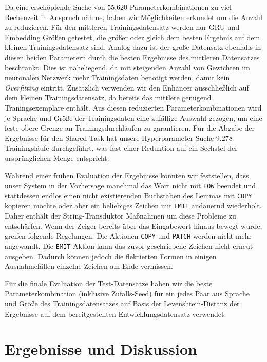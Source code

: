 \documentclass[a4paper]{article}
\newcommand{\action}[1]{\texttt{#1}}
\begin{document}
Da eine erschöpfende Suche von $55.620$ Parameterkombinationen zu viel Rechenzeit in Anspruch nähme, haben wir Möglichkeiten erkundet um die Anzahl zu reduzieren. Für den mittleren Trainingsdatensatz werden nur GRU und Embedding Größen getestet, die größer oder gleich dem besten Ergebnis auf dem kleinen Trainingsdatensatz sind.
Analog dazu ist der große Datensatz ebenfalls in diesen beiden Parametern durch die besten Ergebnisse des mittleren Datensatzes beschränkt.
Dies ist naheliegend, da mit steigenden Anzahl von Gewichten im neuronalen Netzwerk mehr Trainingsdaten benötigt werden, damit kein \textit{Overfitting} eintritt.
Zusätzlich verwenden wir den Enhancer ausschließlich auf dem kleinen Trainingsdatensatz, da bereits das mittlere genügend Traningsexemplare enthält.
Aus diesen reduzierten Parameterkombinationen wird je Sprache und Größe der Trainingsdaten eine zufällige Auswahl gezogen, um eine feste obere Grenze an Trainingsdurchläufen zu garantieren.
Für die Abgabe der Ergebnisse für den Shared Task hat unsere Hyperparameter-Suche $9.278$ Trainingsläufe durchgeführt, was fast einer Reduktion auf ein Sechstel der ursprünglichen Menge entspricht.

Während einer frühen Evaluation der Ergebnisse konnten wir feststellen, dass unser System in der Vorhersage manchmal das Wort nicht mit \action{EOW} beendet und stattdessen endlos einen nicht existierenden Buchstaben des Lemmas mit \action{COPY} kopieren möchte oder aber ein beliebiges Zeichen mit \action{EMIT} andauernd wiederholt.
Daher enthält der String-Transduktor Maßnahmen um diese Probleme zu entschärfen.
Wenn der Zeiger bereits über das Eingabewort hinaus bewegt wurde, greifen folgende Regelungen:
Die Aktionen \action{COPY} und \action{PATCH} werden nicht mehr angewandt. Die \action{EMIT} Aktion kann das zuvor geschriebene Zeichen nicht erneut ausgeben. 
Dadurch können jedoch die flektierten Formen in einigen Ausnahmefällen einzelne Zeichen am Ende vermissen. 

Für die finale Evaluation der Test-Datensätze haben wir die beste Parameterkombination (inklusive Zufalls-Seed) für ein jedes Paar aus Sprache und Größe des Trainingsdatensatzes auf Basis der Levenshtein-Distanz der Ergebnisse auf dem bereitgestellten Entwicklungsdatensatz verwendet.


\section{Ergebnisse und Diskussion}
\label{sec:results}
\end{document}
